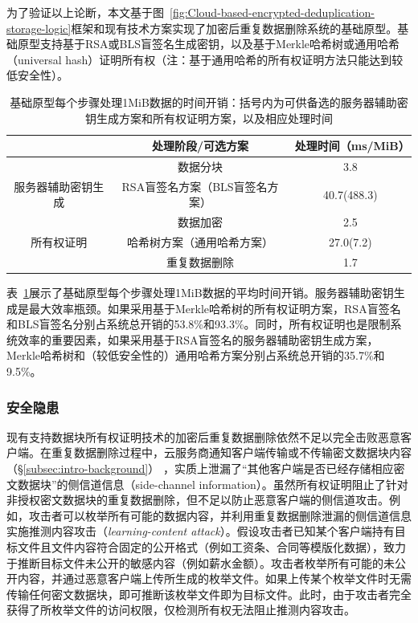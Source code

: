 为了验证以上论断，本文基于图~\ref{fig:Cloud-based-encrypted-deduplication-storage-logic}框架和现有技术方案实现了加密后重复数据删除系统的基础原型。基础原型支持基于RSA\cite{bellare2013DupLESS}或BLS\cite{armknecht2015transparent}盲签名生成密钥，以及基于Merkle哈希树\cite{halevi2011proofs}或通用哈希（universal hash）\cite{xu2013weak}证明所有权（注：基于通用哈希的所有权证明方法\cite{xu2013weak}只能达到较低安全性）。

\begin{table}[!htb]
    \small
    \centering
    \begin{tabular}{@{}ccc@{}}
    \toprule
                           & 处理阶段/可选方案          & 处理时间（ms/MiB） \\ \midrule
                           & 数据分块               & 3.8          \\
    服务器辅助密钥生成              & RSA盲签名方案（BLS盲签名方案） & 40.7(488.3)  \\
    \multirow{3}{*}{所有权证明} & 数据加密               & 2.5          \\
                           & 哈希树方案（通用哈希方案）      & 27.0(7.2)    \\
                           & 重复数据删除             & 1.7          \\ \bottomrule
    \end{tabular}
    \caption{基础原型每个步骤处理1MiB数据的时间开销：括号内为可供备选的服务器辅助密钥生成方案和所有权证明方案，以及相应处理时间}
    \label{tab:intro-bottleneck}
\end{table}

表~\ref{tab:intro-bottleneck}展示了基础原型每个步骤处理1MiB数据的平均时间开销。服务器辅助密钥生成是最大效率瓶颈。如果采用基于Merkle哈希树的所有权证明方案，RSA盲签名和BLS盲签名分别占系统总开销的53.8\%和93.3\%。同时，所有权证明也是限制系统效率的重要因素，如果采用基于RSA盲签名的服务器辅助密钥生成方案，Merkle哈希树和（较低安全性的）通用哈希方案分别占系统总开销的35.7\%和9.5\%。

\subsubsection{安全隐患} 
\label{subsubsec:intro-problem-security}

现有支持数据块所有权证明技术的加密后重复数据删除依然不足以完全击败恶意客户端。在重复数据删除过程中，云服务商通知客户端传输或不传输密文数据块内容（\S\ref{subsec:intro-background}） ，实质上泄漏了“其他客户端是否已经存储相应密文数据块”的侧信道信息（side-channel information）。虽然所有权证明阻止了针对非授权密文数据块的重复数据删除，但不足以防止恶意客户端的侧信道攻击。例如，攻击者可以枚举所有可能的数据内容，并利用重复数据删除泄漏的侧信道信息实施推测内容攻击（{\em learning-content attack}）\cite{harnik10,zuo2018mitigating}。假设攻击者已知某个客户端持有目标文件且文件内容符合固定的公开格式（例如工资条、合同等模版化数据），致力于推断目标文件未公开的敏感内容（例如薪水金额）。攻击者枚举所有可能的未公开内容，并通过恶意客户端上传所生成的枚举文件。如果上传某个枚举文件时无需传输任何密文数据块，即可推断该枚举文件即为目标文件。此时，由于攻击者完全获得了所枚举文件的访问权限，仅检测所有权无法阻止推测内容攻击。


